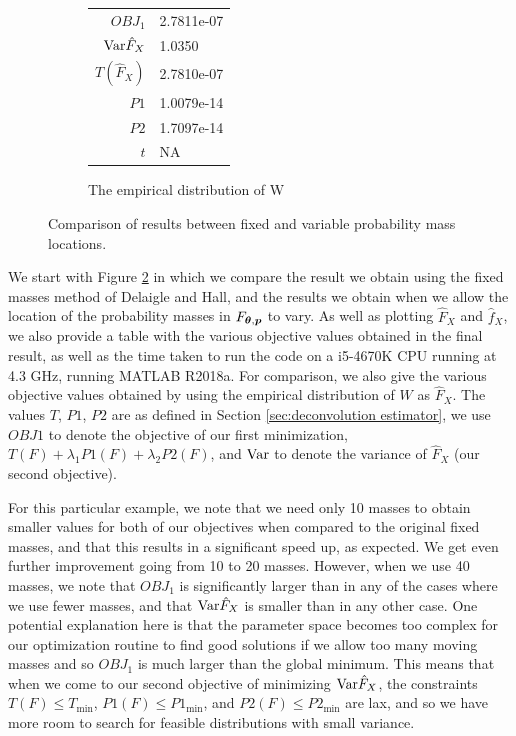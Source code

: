 \begin{figure}
\begin{subfigure}[b]{0.49\textwidth}
		\begin{tabular}{r l}
			$OBJ_1$ & 2.7811e-07\\
			$\mathrm{Var} \hat{F}_X$ & 1.0350\\
			$T(\hat{F}_X)$ & 2.7810e-07\\
			$P1$ & 1.0079e-14\\
			$P2$ & 1.7097e-14\\
			$t$ & NA
		\end{tabular}
		\caption{The empirical distribution of W}
		\label{fig:emp masses example}
	\end{subfigure}
	
	\caption{Comparison of results between fixed and variable probability mass locations.}
	\label{fig:compare fixed moving masses}
\end{figure}

We start with Figure \ref{fig:compare fixed moving masses} in which we compare the result we obtain using the fixed masses method of Delaigle and Hall, and the results we obtain when we allow the location of the probability masses in $F_{{\bm{{\theta}}}, {\bm{{p}}}}$ to vary. As well as plotting $\hat{F}_X$ and $\hat{f}_X$, we also provide a table with the various objective values obtained in the final result, as well as the time taken to run the code on a i5-4670K CPU running at 4.3 GHz, running MATLAB R2018a. For comparison, we also give the various objective values obtained by using the empirical distribution of $W$ as $\hat{F}_X$. The values $T$, $P1$, $P2$ are as defined in Section \ref{sec:deconvolution estimator}, we use $OBJ1$ to denote the objective of our first minimization, $T(F) + \lambda_1 P1(F) + \lambda_2 P2(F)$, and $\mathrm{Var}$ to denote the variance of $\hat{F}_X$ (our second objective).

For this particular example, we note that we need only 10 masses to obtain smaller values for both of our objectives when compared to the original fixed masses, and that this results in a significant speed up, as expected. We get even further improvement going from 10 to 20 masses. However, when we use 40 masses, we note that $OBJ_1$ is significantly larger than in any of the cases where we use fewer masses, and that $\mathrm{Var}\hat{F}_X$ is smaller than in any other case. One potential explanation here is that the parameter space becomes too complex for our optimization routine to find good solutions if we allow too many moving masses and so $OBJ_1$ is much larger than the global minimum. This means that when we come to our second objective of minimizing $\mathrm{Var} \hat{F}_X$, the constraints $T(F) \leq T_\mathrm{min}$, $P1(F) \leq P1_\mathrm{min}$, and $P2(F) \leq P2_\mathrm{min}$ are lax, and so we have more room to search for feasible distributions with small variance.

